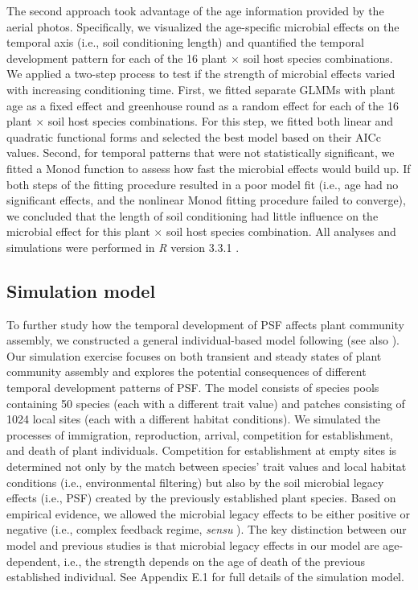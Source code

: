  
The second approach took advantage of the age information provided by the aerial photos. Specifically, we visualized the age-specific microbial effects on the temporal axis (i.e., soil conditioning length) and quantified the temporal development pattern for each of the 16 plant $\times$ soil host species combinations.
We applied a two-step process to test if the strength of microbial effects varied with increasing conditioning time. First, we fitted separate GLMMs with plant age as a fixed effect and greenhouse round as a random effect for each of the 16 plant $\times$ soil host species combinations. For this step, we fitted both linear and quadratic functional forms and selected the best model based on their AICc values. 
Second, for temporal patterns that were not statistically significant, we fitted a Monod function to assess how fast the microbial effects would build up. If both steps of the fitting procedure resulted in a poor model fit (i.e., age had no significant effects, and the nonlinear Monod fitting procedure failed to converge), we concluded that the length of soil conditioning had little influence on the microbial effect for this plant $\times$ soil host species combination. All analyses and simulations were performed in \textit{R} version 3.3.1 \citep{R}. 
\par



\subsection*{Simulation model}
To further study how the temporal development of PSF affects plant community assembly, we constructed a general individual-based model following \citet{FukamiNakajima2011} (see also \citealp{Fukami2013, ZeeFukami2015, Fukami2017}). 
Our simulation exercise focuses on both transient and steady states of plant community assembly and explores the potential consequences of different temporal development patterns of PSF.
The model consists of species pools containing 50 species (each with a different trait value) and patches consisting of 1024 local sites (each with a different habitat conditions). We simulated the processes of immigration, reproduction, arrival, competition for establishment, and death of plant individuals. 
Competition for establishment at empty sites is determined not only by the match between species' trait values and local habitat conditions (i.e., environmental filtering) but also by the soil microbial legacy effects (i.e., PSF) created by the previously established plant species. 
Based on empirical evidence, we allowed the microbial legacy effects to be either positive or negative (i.e., complex feedback regime, \textit{sensu} \citealp{Fukami2013}).
The key distinction between our model and previous studies is that microbial legacy effects in our model are age-dependent, i.e., the strength depends on the age of death of the previous established individual. See Appendix E.1 for full details of the simulation model.
\par


